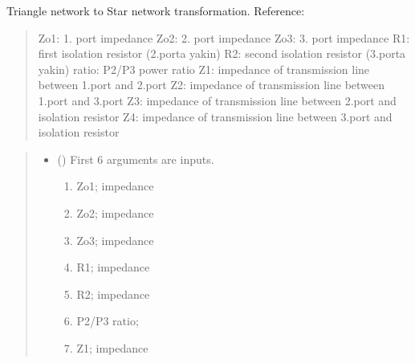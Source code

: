 \documentclass[letterpaper,10pt,english]{sphinxmanual}
\begin{document}

\begin{fulllineitems}
\label{\detokenize{components:components.GyselPowerDivider}}
\pysigstartsignatures
{}
\pysigstopsignatures
\sphinxAtStartPar
Triangle network to Star network transformation.
Reference:
\begin{quote}

\sphinxAtStartPar
Zo1: 1. port impedance
Zo2: 2. port impedance
Zo3: 3. port impedance
R1: first isolation resistor (2.porta yakin)
R2: second isolation resistor (3.porta yakin)
ratio: P2/P3 power ratio
Z1: impedance of transmission line between 1.port and 2.port
Z2: impedance of transmission line between 1.port and 3.port
Z3: impedance of transmission line between 2.port and isolation resistor
Z4: impedance of transmission line between 3.port and isolation resistor
\end{quote}
\begin{quote}\begin{description}
\begin{itemize}
\item {} 
\sphinxAtStartPar
{} () \textendash{} 
\sphinxAtStartPar
First 6 arguments are inputs.
\begin{enumerate}
%
\item {} 
\sphinxAtStartPar
Zo1;  impedance

\item {} 
\sphinxAtStartPar
Zo2;  impedance

\item {} 
\sphinxAtStartPar
Zo3;  impedance

\item {} 
\sphinxAtStartPar
R1; impedance

\item {} 
\sphinxAtStartPar
R2; impedance

\item {} 
\sphinxAtStartPar
P2/P3 ratio;

\item {} 
\sphinxAtStartPar
Z1; impedance


\end{enumerate}
\end{itemize}
\end{description}
\end{quote}
\end{fulllineitems}
\end{document}
